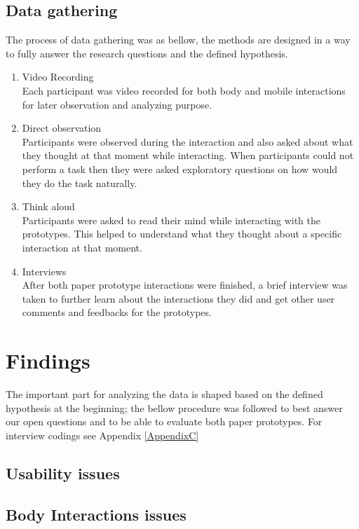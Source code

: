 \subsection{Data gathering}
The process of data gathering was as bellow, the methods are designed in a way to fully answer the research questions and the defined hypothesis.


\begin{enumerate}
\item Video Recording \\
Each participant was video recorded for both body and mobile interactions for later observation and analyzing purpose. 

\item Direct observation \\
Participants were observed during the interaction and also asked about what they thought at that moment while interacting. When participants could not perform a task then they were asked exploratory questions on how would they do the task naturally.

\item Think aloud \\
Participants were asked to read their mind while interacting with the prototypes. This helped to understand what they thought about a specific interaction at that moment. 

\item Interviews \\
After both paper prototype interactions were finished, a brief interview was taken to further learn about the interactions they did and get other user comments and feedbacks for the prototypes.
\end{enumerate}



\section{Findings}
The important part for analyzing the data is shaped based on the defined hypothesis at the beginning; the bellow procedure was followed to best answer our open questions and to be able to evaluate both paper prototypes. For interview codings see Appendix \ref{AppendixC}


\subsection{Usability issues}


\subsection{Body Interactions issues}

